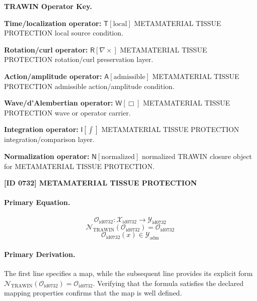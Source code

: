 \par\vspace{0.45\baselineskip}
\noindent\begin{minipage}[t]{\linewidth}
\begingroup
\small
\raggedright
\textbf{TRAWIN Operator Key.}\par
\noindent\textbf{Time/localization operator:} $\mathsf{T}\!\left[\mathrm{local}\right]$ METAMATERIAL TISSUE PROTECTION local source condition.\par
\noindent\textbf{Rotation/curl operator:} $\mathsf{R}\!\left[\nabla\times\right]$ METAMATERIAL TISSUE PROTECTION rotation/curl preservation layer.\par
\noindent\textbf{Action/amplitude operator:} $\mathsf{A}\!\left[\mathrm{admissible}\right]$ METAMATERIAL TISSUE PROTECTION admissible action/amplitude condition.\par
\noindent\textbf{Wave/d'Alembertian operator:} $\mathsf{W}\!\left[\Box\right]$ METAMATERIAL TISSUE PROTECTION wave or operator carrier.\par
\noindent\textbf{Integration operator:} $\mathsf{I}\!\left[\int\right]$ METAMATERIAL TISSUE PROTECTION integration/comparison layer.\par
\noindent\textbf{Normalization operator:} $\mathsf{N}\!\left[\mathrm{normalized}\right]$ normalized TRAWIN closure object for METAMATERIAL TISSUE PROTECTION.\par
\endgroup
\end{minipage}

\clearpage
\noindent\textbf{[ID 0732] METAMATERIAL TISSUE PROTECTION}\par
\vspace{0.35em}
\paragraph{Primary Equation.}
\[
\mathcal{O}_{\mathrm{id0732}}:\mathcal{X}_{\mathrm{id0732}}\longrightarrow\mathcal{Y}_{\mathrm{id0732}}
\]
\[
\mathcal{N}_{\mathrm{TRAWIN}}(\mathcal{O}_{\mathrm{id0732}})=\mathcal{O}_{\mathrm{id0732}}
\]
\[
\mathcal{O}_{\mathrm{id0732}}(x)\in\mathcal{Y}_{\mathrm{adm}}
\]

\paragraph{Primary Derivation.}
The first line specifies a map, while the subsequent line provides its explicit form \( \mathcal{N}_{\mathrm{TRAWIN}}(\mathcal{O}_{\mathrm{id0732}})=\mathcal{O}_{\mathrm{id0732}} \). Verifying that the formula satisfies the declared mapping properties confirms that the map is well defined.
